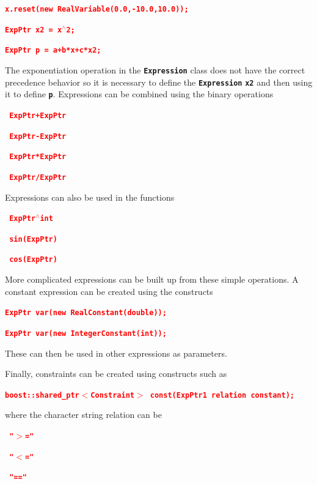 \documentclass[12pt]{report} %
\begin{document}
\textcolor{red}{\texttt{\textbf{x.reset(new RealVariable(0.0,-10.0,10.0));}}}

\textcolor{red}{\texttt{\textbf{ExpPtr x2 = x$\boldsymbol{\mathrm{^\wedge}}$2;}}}

\textcolor{red}{\texttt{\textbf{ExpPtr p = a+b*x+c*x2;}}}

The exponentiation operation in the \texttt{\textbf{Expression}} class does not have the correct precedence behavior so it is necessary to define the \texttt{\textbf{Expression}} \texttt{\textbf{x2}} and then using it to define \texttt{\textbf{p}}. Expressions can be combined using the binary operations

\textcolor{red}{\texttt{\textbf{    ExpPtr+ExpPtr}}}

\textcolor{red}{\texttt{\textbf{    ExpPtr-ExpPtr}}}

\textcolor{red}{\texttt{\textbf{    ExpPtr*ExpPtr}}}

\textcolor{red}{\texttt{\textbf{    ExpPtr/ExpPtr}}}

Expressions can also be used in the functions

\textcolor{red}{\texttt{\textbf{    ExpPtr$\boldsymbol{\mathrm{^{\wedge}}}$int}}}

\textcolor{red}{\texttt{\textbf{    sin(ExpPtr)}}}

\textcolor{red}{\texttt{\textbf{    cos(ExpPtr)}}}

More complicated expressions can be built up from these simple operations. A constant expression can be created using the constructs

\textcolor{red}{\texttt{\textbf{ExpPtr var(new RealConstant(double));}}}

\textcolor{red}{\texttt{\textbf{ExpPtr var(new IntegerConstant(int));}}}

These can then be used in other expressions as parameters.

Finally, constraints can be created using constructs such as

\textcolor{red}{\texttt{\textbf{boost::shared\_ptr$\boldsymbol{\mathrm{<}}$Constraint$\boldsymbol{\mathrm{>}}$ const(ExpPtr1 relation constant);}}}

where the character string relation can be

\textcolor{red}{\texttt{\textbf{    "$\boldsymbol{\mathrm{>}}$="}}}

\textcolor{red}{\texttt{\textbf{    "$\boldsymbol{\mathrm{<}}$="}}}

\textcolor{red}{\texttt{\textbf{    "=="}}}
\end{document}

